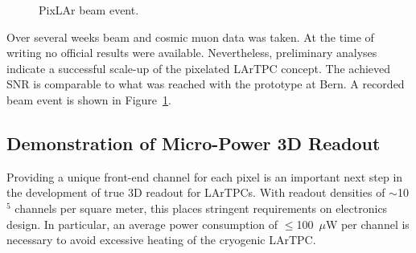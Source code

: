 \documentclass[a4paper]{article}
\begin{document}
\begin{figure}[htb]
	\caption[PixLAr beam event]{%
		PixLAr beam event.
	}
	\label{fig:pixlar_event}
\end{figure}

Over several weeks beam and cosmic muon data was taken.
At the time of writing no official results were available.
Nevertheless, preliminary analyses indicate a successful scale-up of the pixelated LArTPC concept.
The achieved SNR is comparable to what was reached with the prototype at Bern.
A recorded beam event is shown in Figure~\ref{fig:pixlar_event}.
	
\subsection{Demonstration of Micro-Power 3D Readout}\label{sec:pix}

Providing a unique front-end channel for each pixel is an important next step in the development of true 3D readout for LArTPCs.
With readout densities of $\sim$10$^5$ channels per square meter, this places stringent requirements on electronics design.
In particular, an average power consumption of $\leq$100~$\mu$W per channel is necessary to avoid excessive heating of the cryogenic LArTPC.
\end{document}
